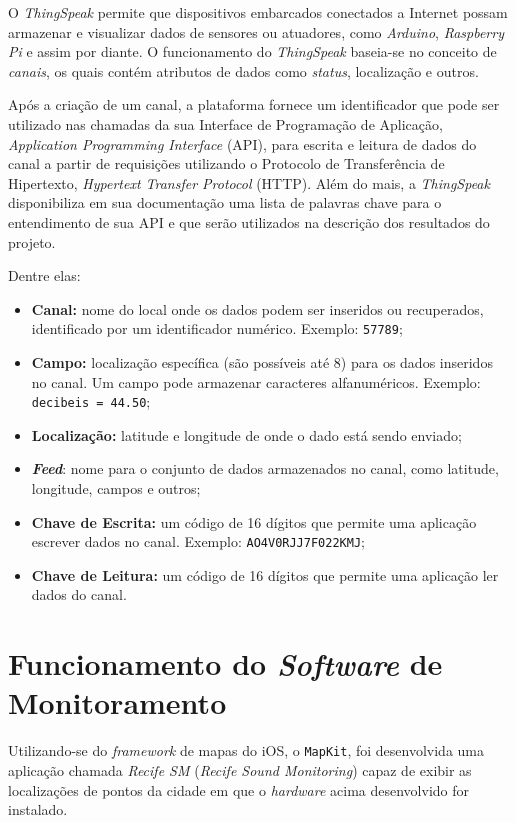\documentclass[
    12pt,               %
    openright,          %
    oneside,
    a4paper,            
    english,            %
    brazil              %
    ]{abntex2}
\begin{document}
O \textit{ThingSpeak} permite que dispositivos embarcados conectados a Internet possam armazenar e visualizar dados de sensores ou atuadores, como \textit{Arduino}, \textit{Raspberry Pi} e assim por diante. O funcionamento do \textit{ThingSpeak} baseia-se no conceito de \textit{canais}, os quais contém atributos de dados como \textit{status}, localização e outros. 

Após a criação de um canal, a plataforma fornece um identificador que pode ser utilizado nas chamadas da sua Interface de Programação de Aplicação, \textit{Application Programming Interface} (API), para escrita e leitura de dados do canal a partir de requisições utilizando o Protocolo de Transferência de Hipertexto, \textit{Hypertext Transfer Protocol} (HTTP). Além do mais, a \textit{ThingSpeak} disponibiliza em sua documentação uma lista de palavras chave para o entendimento de sua API e que serão utilizados na descrição dos resultados do projeto. 

Dentre elas:

\begin{itemize}
  \item \textbf{Canal:} nome do local onde os dados podem ser inseridos ou recuperados, identificado por um identificador numérico. Exemplo: \texttt{57789};
  \item \textbf{Campo:} localização específica (são possíveis até 8) para os dados inseridos no canal. Um campo pode armazenar caracteres alfanuméricos. Exemplo: \texttt{decibeis = 44.50};
  \item \textbf{Localização:} latitude e longitude de onde o dado está sendo enviado;
  \item \textbf{\textit{Feed}}: nome para o conjunto de dados armazenados no canal, como latitude, longitude, campos e outros;
  \item \textbf{Chave de Escrita:} um código de 16 dígitos que permite uma aplicação escrever dados no canal. Exemplo: \texttt{AO4V0RJJ7F022KMJ};
  \item \textbf{Chave de Leitura:} um código de 16 dígitos que permite uma aplicação ler dados do canal.
\end{itemize}

\section{Funcionamento do \textit{Software} de Monitoramento}

Utilizando-se do \textit{framework} de mapas do iOS, o \texttt{MapKit}, foi desenvolvida uma aplicação chamada \textit{Recife SM} (\textit{Recife Sound Monitoring}) capaz de exibir as localizações de pontos da cidade em que o \textit{hardware} acima desenvolvido for instalado.
\end{document}
